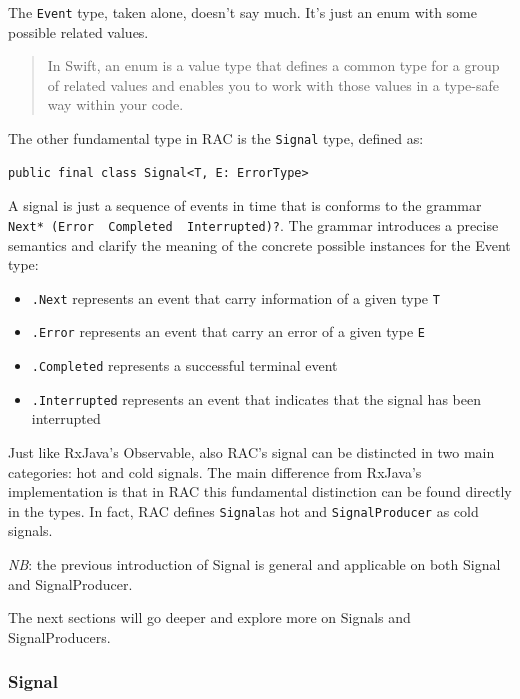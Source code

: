 The \texttt{Event} type, taken alone, doesn't say much. It's just an
enum with some possible related values.

\begin{quote}
In Swift, an enum is a value type that defines a common type for a group
of related values and enables you to work with those values in a
type-safe way within your code.
\end{quote}

The other fundamental type in RAC is the \texttt{Signal} type, defined
as:

\begin{verbatim}
public final class Signal<T, E: ErrorType>
\end{verbatim}

A signal is just a sequence of events in time that is conforms to the
grammar
\texttt{Next*\ (Error\ \textbar{}\ Completed\ \textbar{}\ Interrupted)?}.
The grammar introduces a precise semantics and clarify the meaning of
the concrete possible instances for the Event type:

\begin{itemize}
\itemsep1pt\parskip0pt
\item
  \texttt{.Next} represents an event that carry information of a given
  type \texttt{T}
\item
  \texttt{.Error} represents an event that carry an error of a given
  type \texttt{E}
\item
  \texttt{.Completed} represents a successful terminal event
\item
  \texttt{.Interrupted} represents an event that indicates that the
  signal has been interrupted
\end{itemize}

Just like RxJava's Observable, also RAC's signal can be distincted in
two main categories: hot and cold signals. The main difference from
RxJava's implementation is that in RAC this fundamental distinction can
be found directly in the types. In fact, RAC defines \texttt{Signal}as
hot and \texttt{SignalProducer} as cold signals.

\emph{NB}: the previous introduction of Signal is general and applicable
on both Signal and SignalProducer.

The next sections will go deeper and explore more on Signals and
SignalProducers.

\subsubsection{Signal}\label{signal}

